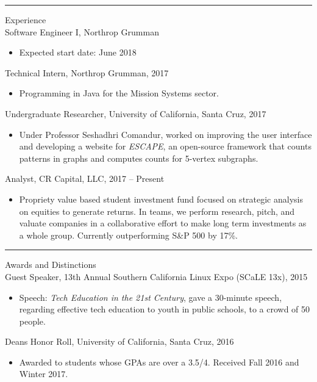 \documentclass{res}
\begin{document}
\begin{resume}
\hrule width18.5cm

{\huge Experience}\\[2mm]
{\Large Software Engineer I, Northrop Grumman}\\
	\begin{itemize}
		\vspace{-3mm}
		\item Expected start date: June 2018
	\end{itemize}
{\Large Technical Intern, Northrop Grumman, 2017}\\
	\begin{itemize}
		\vspace{-3mm}
		\item Programming in Java for the Mission Systems sector.
	\end{itemize}
{\Large Undergraduate Researcher, University of California, Santa Cruz, 2017}\\
	\begin{itemize}
		\vspace{-3mm}
		\item Under Professor Seshadhri Comandur, worked on improving the user interface and developing a website for \textit{ESCAPE}, an open-source framework that counts patterns in graphs and computes counts for 5-vertex subgraphs.
	\end{itemize}
{\Large Analyst, CR Capital, LLC, 2017 -- Present}\\
	\begin{itemize}
		\vspace{-3mm}
		\item Propriety value based student investment fund focused on strategic analysis on equities to generate returns. In teams, we perform research, pitch, and valuate companies in a collaborative effort to make long term investments as a whole group. Currently outperforming S\&P 500 by 17\%.
	\end{itemize}
	\vspace{2mm}

\hrule width18.5cm

{\huge Awards and Distinctions}\\[2mm]
{\Large Guest Speaker, 13th Annual Southern California Linux Expo (SCaLE 13x), 2015}\\
	\begin{itemize}
		\vspace{-3mm}
		\item Speech: \textit{Tech Education in the 21st Century}, gave a 30-minute speech, regarding effective tech education to youth in public schools, to a crowd of 50 people.
	\end{itemize}
{\Large Dean\textquotesingle s Honor Roll, University of California, Santa Cruz, 2016}\\
	\begin{itemize}
		\vspace{-3mm}
		\item Awarded to students whose GPAs are over a 3.5/4. Received Fall 2016 and Winter 2017.
	\end{itemize}
\vspace{-1mm}

\end{resume}
\end{document}
